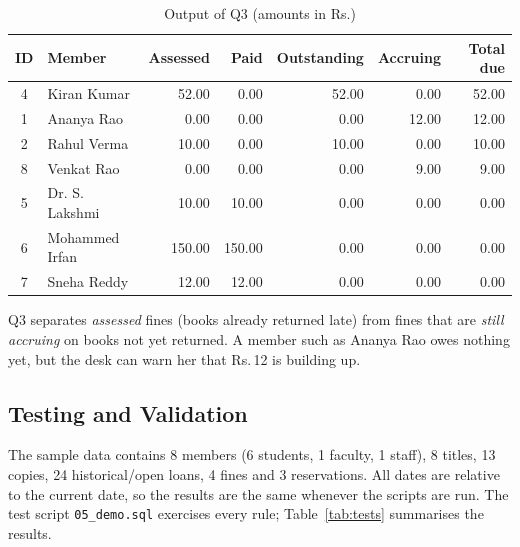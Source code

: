 \documentclass[11pt,a4paper]{report}
\begin{document}
\begin{table}[H]
    \centering
    \caption{Output of Q3 (amounts in Rs.)}
    \footnotesize
    \begin{tabular}{|c|l|r|r|r|r|r|}
        \hline
        \textbf{ID} & \textbf{Member} & \textbf{Assessed} & \textbf{Paid} & \textbf{Outstanding} & \textbf{Accruing} & \textbf{Total due} \\ \hline
        4 & Kiran Kumar & 52.00 & 0.00 & 52.00 & 0.00 & 52.00 \\ \hline
        1 & Ananya Rao & 0.00 & 0.00 & 0.00 & 12.00 & 12.00 \\ \hline
        2 & Rahul Verma & 10.00 & 0.00 & 10.00 & 0.00 & 10.00 \\ \hline
        8 & Venkat Rao & 0.00 & 0.00 & 0.00 & 9.00 & 9.00 \\ \hline
        5 & Dr. S. Lakshmi & 10.00 & 10.00 & 0.00 & 0.00 & 0.00 \\ \hline
        6 & Mohammed Irfan & 150.00 & 150.00 & 0.00 & 0.00 & 0.00 \\ \hline
        7 & Sneha Reddy & 12.00 & 12.00 & 0.00 & 0.00 & 0.00 \\ \hline
    \end{tabular}
\end{table}

Q3 separates \emph{assessed} fines (books already returned late) from fines that are \emph{still accruing} on books not yet returned. A member such as Ananya Rao owes nothing yet, but the desk can warn her that Rs.\,12 is building up.

\subsection{Testing and Validation}
\label{sec:testing}
The sample data contains 8 members (6 students, 1 faculty, 1 staff), 8 titles, 13 copies, 24 historical/open loans, 4 fines and 3 reservations. All dates are relative to the current date, so the results are the same whenever the scripts are run. The test script \texttt{05\_demo.sql} exercises every rule; Table~\ref{tab:tests} summarises the results.
\end{document}
